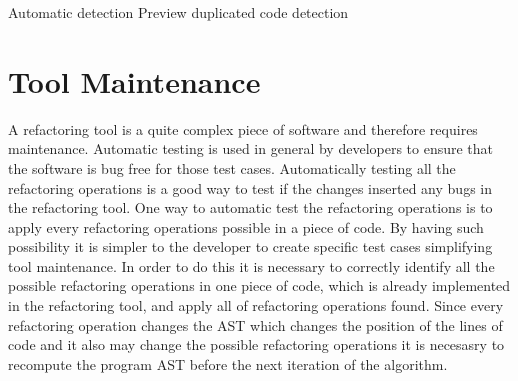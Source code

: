 Automatic detection
Preview
duplicated code detection
\section{Tool Maintenance} %



A refactoring tool is a quite complex piece of software and therefore requires maintenance.
Automatic testing is used in general by developers to ensure that the software
is bug free for those test cases.
Automatically testing all the refactoring operations is a good way to test if
the changes inserted any bugs in the refactoring tool.
One way to automatic test the refactoring operations is to apply every refactoring
operations possible in a piece of code. By having such possibility it is simpler
to the developer to create specific test cases simplifying tool maintenance.
In order to do this it is necessary to correctly identify all the possible refactoring
operations in one piece of code, which is already implemented in the refactoring
tool, and apply all of refactoring operations found.
Since every refactoring operation changes the AST which changes the position of the
lines of code and it also may change the possible refactoring operations it is necesasry to recompute the
program AST before the next iteration of the algorithm.

